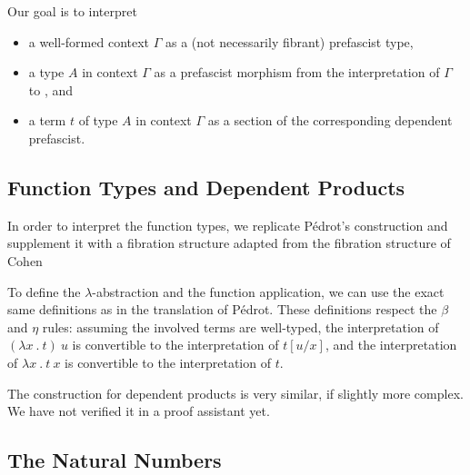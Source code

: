 Our goal is to interpret 
\begin{itemize}
\item a well-formed context \( \Gamma \) as a (not necessarily fibrant) prefascist type,
\item a type \( A \) in context \( \Gamma \) as a prefascist morphism from
the interpretation of \( \Gamma \) to , and
\item a term \( t \) of type \( A \) in context \( \Gamma \) as a section of
the corresponding dependent prefascist.
\end{itemize} 

\subsection{Function Types and Dependent Products}

In order to interpret the function types, we replicate Pédrot's construction
and supplement it with a fibration structure adapted from the fibration 
structure of Cohen \etal
% 

% 


To define the \( λ \)-abstraction and the function application, we can use the
exact same definitions as in the translation of Pédrot.
% 
These definitions respect the \( \beta \) and \( \eta \) rules: assuming the
involved terms are well-typed, the interpretation of \( (λx\ .\ t)\ u \) is 
convertible to the interpretation of \( t[u/x] \), and the interpretation
of \( λx\ .\ t\ x \) is convertible to the interpretation of \( t \).

The construction for dependent products is very similar, if slightly more
complex. We have not verified it in a proof assistant yet.

\subsection{The Natural Numbers}

